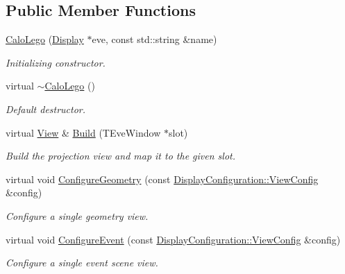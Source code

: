 \subsection*{Public Member Functions}
\begin{DoxyCompactItemize}
\item 
\hyperlink{class_d_d4hep_1_1_calo_lego_abeda4832cbd7103bbd3b1d4bfe2fe1dc}{CaloLego} (\hyperlink{class_d_d4hep_1_1_display}{Display} $\ast$eve, const std::string \&name)
\begin{DoxyCompactList}\small\item\em Initializing constructor. \item\end{DoxyCompactList}\item 
virtual \hyperlink{class_d_d4hep_1_1_calo_lego_a8416ec621ced1b3b415e48da1cd5c45b}{$\sim$CaloLego} ()
\begin{DoxyCompactList}\small\item\em Default destructor. \item\end{DoxyCompactList}\item 
virtual \hyperlink{class_d_d4hep_1_1_view}{View} \& \hyperlink{class_d_d4hep_1_1_calo_lego_ab1ef28e69a78dbe27e6a33b1d22cc713}{Build} (TEveWindow $\ast$slot)
\begin{DoxyCompactList}\small\item\em Build the projection view and map it to the given slot. \item\end{DoxyCompactList}\item 
virtual void \hyperlink{class_d_d4hep_1_1_calo_lego_aca92ae6d2fe4e24a928fa23dbe755d19}{ConfigureGeometry} (const \hyperlink{class_d_d4hep_1_1_display_configuration_1_1_view_config}{DisplayConfiguration::ViewConfig} \&config)
\begin{DoxyCompactList}\small\item\em Configure a single geometry view. \item\end{DoxyCompactList}\item 
virtual void \hyperlink{class_d_d4hep_1_1_calo_lego_a997e3fea32d37374ef4c6c95e087af9c}{ConfigureEvent} (const \hyperlink{class_d_d4hep_1_1_display_configuration_1_1_view_config}{DisplayConfiguration::ViewConfig} \&config)
\begin{DoxyCompactList}\small\item\em Configure a single event scene view. \item\end{DoxyCompactList}\item 

\end{DoxyCompactItemize}
